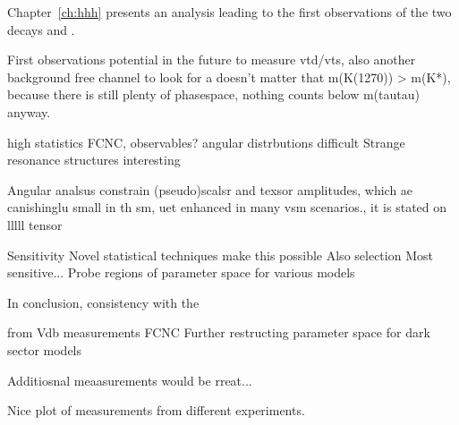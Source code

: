 








Chapter~\ref{ch:hhh} presents an analysis leading to the first observations of the two decays
\btokpipimumu and \btophikmumu.




First observations
potential in the future to measure vtd/vts, also another background free channel to look for a \db
doesn't matter that m(K(1270)) > m(K*), because there is still plenty of phasespace, nothing counts
below m(tautau) anyway.

high statistics
FCNC, observables?
angular distrbutions difficult
Strange resonance structures interesting

Angular analsus constrain (pseudo)scalsr and texsor amplitudes, which ae canishinglu small in th
sm, uet enhanced in many vsm scenarios., it is stated on lllll tensor



\btokstrdb
Sensitivity
Novel statistical techniques make this possible
Also selection
Most sensitive...
Probe regions of parameter space for various models



In conclusion,
consistency with the \sm

from Vdb measurements
FCNC
Further restructing parameter space for dark sector models

Additiosnal meaasurements would be rreat...


Nice plot of measurements from different experiments.








